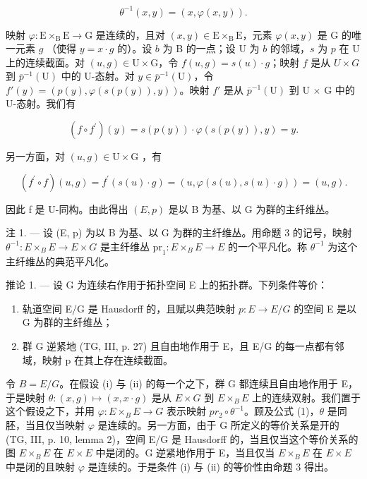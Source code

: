 \[
\theta^ {- 1} (x, y) = (x, \varphi (x, y)).\tag{1}
\]

映射 \(\varphi\colon\mathrm{E}\times_{\mathrm{B}}\mathrm{E}\to\mathrm{G}\) 是连续的，且对 \((x,y)\in\mathrm{E}\times_{\mathrm{B}}\mathrm{E}\)，元素 \(\varphi(x,y)\) 是 G 的唯一元素 \(g\) （使得 \(y=x\cdot g\) 的）。设 \(b\) 为 B 的一点；设 U 为 \(b\) 的邻域，\(s\) 为 \(p\) 在 U 上的连续截面。对 \((u,g)\in\mathrm{U}\times\mathrm{G}\)，令 \(f(u,g)=s(u)\cdot g\)；映射 \(f\) 是从 \(U \times G\) 到 \(\overline{p}^{-1}(\mathrm{U})\) 中的 U-态射。对 \(y\in\overline{p}^{-1}(\mathrm{U})\)，令 \(f'(y)=(p(y),\varphi(s(p(y)),y))\)。映射 \(f'\) 是从 \(\overline{p}^{-1}(\mathrm{U})\) 到 U \(\times\) G 中的 U-态射。我们有

\[
(f \circ f ^ {\prime}) (y) = s (p (y)) \cdot \varphi (s (p (y)), y) = y.
\]

另一方面，对 \((u,g)\in \mathrm{U}\times \mathrm{G}\) ，有

\[
(f ^ {\prime} \circ f) (u, g) = f ^ {\prime} (s (u) \cdot g) = (u, \varphi (s (u), s (u) \cdot g)) = (u, g).
\]

因此 f 是 U-同构。由此得出 \((E,p)\) 是以 B 为基、以 G 为群的主纤维丛。

注 1. --- 设 (E, p) 为以 B 为基、以 G 为群的主纤维丛。用命题 3 的记号，映射 \(\theta^{-1}\colon E \times_{B} E \to E \times G\) 是主纤维丛 \(\mathrm{pr}_{1}\colon E \times_{B} E \to E\) 的一个平凡化。称 \(\theta^{-1}\) 为这个主纤维丛的典范平凡化。

推论 1. --- 设 G 为连续右作用于拓扑空间 E 上的拓扑群。下列条件等价：

\begin{enumerate}
\def\labelenumi{(\roman{enumi})}
\item
  轨道空间 E/G 是 Hausdorff 的，且赋以典范映射 \(p: E \rightarrow E/G\) 的空间 E 是以 G 为群的主纤维丛；
\item
  群 G 逆紧地 (TG, III, p. 27) 且自由地作用于 E，且 E/G 的每一点都有邻域，映射 p 在其上存在连续截面。
\end{enumerate}

令 \(B=E/G\)。在假设 (i) 与 (ii) 的每一个之下，群 G 都连续且自由地作用于 E，于是映射 \(\theta\colon(x,g)\mapsto(x,x\cdot g)\) 是从 \(E\times G\) 到 \(E\times_{B}E\) 上的连续双射。我们置于这个假设之下，并用 \(\varphi\colon E\times_{B}E\to G\) 表示映射 \(pr_{2}\circ\theta^{-1}\)。顾及公式 (1)，\(\theta\) 是同胚，当且仅当映射 \(\varphi\) 是连续的。另一方面，由于 G 所定义的等价关系是开的 (TG, III, p. 10, lemma 2)，空间 E/G 是 Hausdorff 的，当且仅当这个等价关系的图 \(E\times_{B}E\) 在 \(E\times E\) 中是闭的。G 逆紧地作用于 E，当且仅当 \(E\times_{B}E\) 在 \(E\times E\) 中是闭的且映射 \(\varphi\) 是连续的。于是条件 (i) 与 (ii) 的等价性由命题 3 得出。


